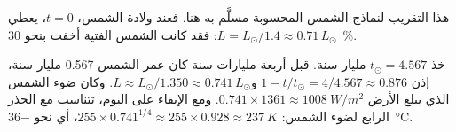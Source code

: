 هذا التقريب لنماذج الشمس المحسوبة مسلَّم به هنا. فعند
ولادة الشمس، $t = 0$، يعطي $L = L_\odot/1.4 \approx 0.71\,L_\odot$:
فقد كانت الشمس الفتية أخفت بنحو \qty{30}{\percent}.

\begin{example}\label{ex:g12:early-earth:young-sun}
خذ $t_\odot = 4.567$ مليار سنة. قبل أربعة مليارات سنة كان عمر الشمس
0.567 مليار سنة، إذن $1 - t/t_\odot = 4/4.567 \approx 0.876$
و$L \approx L_\odot/1.350 \approx 0.741\,L_\odot$. وكان ضوء الشمس الذي يبلغ
الأرض $0.741 \times 1361 \approx \qty{1008}{W/m^2}$. ومع الإبقاء على 
اليوم، تتناسب  مع الجذر الرابع لضوء
الشمس: $255 \times 0.741^{1/4} \approx 255 \times 0.928 \approx
\qty{237}{K}$، أي نحو \qty{-36}{\celsius}.
\end{example}

